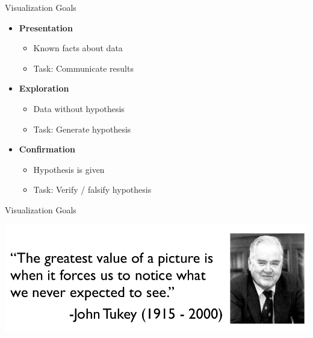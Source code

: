 \documentclass{beamer}
\begin{document}
\begin{frame}{Visualization Goals} 
    \begin{itemize}
        \item {\bf Presentation}
        \begin{itemize}
            \item Known facts about data
            \item Task: Communicate results
        \end{itemize}
        \item {\bf Exploration}
        \begin{itemize}
            \item Data without hypothesis   
            \item Task: Generate hypothesis
        \end{itemize}
        \item {\bf Confirmation}
        \begin{itemize}
            \item Hypothesis is given
            \item Task: Verify / falsify hypothesis
        \end{itemize}
    \end{itemize}
\end{frame}  


\begin{frame}{Visualization Goals} 
    \begin{center}
        \includegraphics[scale=0.35]{tukeyEDA.png} 
    \end{center} 
\end{frame}  
\end{document}
